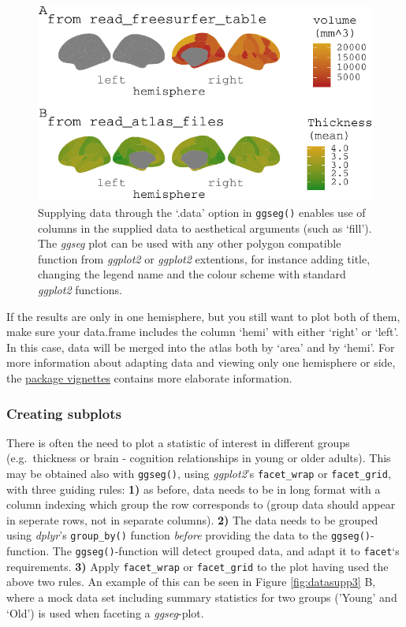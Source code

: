 \documentclass[fleqn,10pt]{wlpeerj} %
\begin{document}
\begin{figure}
\centering
\includegraphics{msc_ggseg_files/figure-latex/datasupp-1.pdf}
\caption{\label{fig:datasupp}Supplying data through the `.data' option in \texttt{ggseg()} enables use of columns in the supplied data to aesthetical arguments (such as `fill'). The \emph{ggseg} plot can be used with any other polygon compatible function from \emph{ggplot2} or \emph{ggplot2} extentions, for instance adding title, changing the legend name and the colour scheme with standard \emph{ggplot2} functions.}
\end{figure}

If the results are only in one hemisphere, but you still want to plot both of them, make sure your data.frame includes the column `hemi' with either `right' or `left'.
In this case, data will be merged into the atlas both by `area' and by `hemi'.
For more information about adapting data and viewing only one hemisphere or side, the \href{https://lcbc-uio.github.io/ggseg/articles/ggseg.html\#single-hemisphere-results}{package vignettes} contains more elaborate information.

\hypertarget{creating-subplots}{%
\subsubsection{Creating subplots}\label{creating-subplots}}

There is often the need to plot a statistic of interest in different groups (e.g.~thickness or brain - cognition relationships in young or older adults).
This may be obtained also with \texttt{ggseg()}, using \emph{ggplot2}'s \texttt{facet\_wrap} or \texttt{facet\_grid}, with three guiding rules:
\textbf{1)} as before, data needs to be in long format with a column indexing which group the row corresponds to (group data should appear in seperate rows, not in separate columns).
\textbf{2)} The data needs to be grouped using \emph{dplyr}'s \texttt{group\_by()} function \emph{before} providing the data to the \texttt{ggseg()}-function.
The \texttt{ggseg()}-function will detect grouped data, and adapt it to \texttt{facet}`s requirements.
\textbf{3)} Apply \texttt{facet\_wrap} or \texttt{facet\_grid} to the plot having used the above two rules.
An example of this can be seen in Figure \ref{fig:datasupp3} B, where a mock data set including summary statistics for two groups ('Young' and `Old') is used when faceting a \emph{ggseg}-plot.
\end{document}
